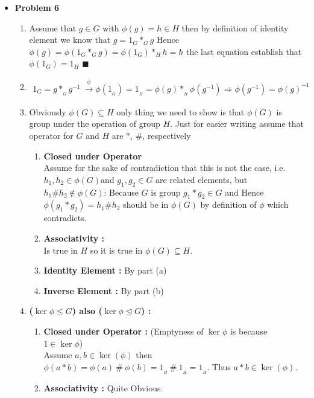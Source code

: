 \documentclass{article}
\begin{document}
\begin{itemize}
	\item{\textcolor{for}{\textbf{Problem 6}}}
		\begin{enumerate}[label=(\alph*)]
			\item Assume that $g\in G$ with $\phi(g)=h\in H$ then by definition of identity element we know that $g = 1_{G} *_{G} g$
				Hence $\phi(g) = \phi(1_{G} *_{G} g) = \phi(1_{G}) *_{H} h = h$ the last equation establish that 
				$\phi(1_{G}) = 1_{H}$ $\blacksquare$
			\item 
				\begin{align*}
					1_G = g *_{{}_{G}} g^{-1}\ \xrightarrow{\phi} \phi(1_{{}_{G}}) = 1_{{}_{H}} = \phi(g) *_{{}_{H}} \phi(g^{-1})
					\Rightarrow \phi(g^{-1}) = \left.\phi(g)\right.^{-1}\
				\end{align*}
			\item Obviously $\phi(G)\subseteq H$ only thing we need to show is that $\phi(G)$ is group under the operation of group $H$.
				Just for easier writing assume that operator for $G$ and $H$ are $*$, $\#$, respectively
				\begin{enumerate}[label=(\textbf{\Roman*})]
					\item{\textbf{Closed under Operator}} \\
						Assume for the sake of contradiction that this is not the case, i.e. 
						$h_1, h_2\in \phi(G)$and $g_1, g_2 \in G$ are related elements, but $h_1 \# h_2 \not\in \phi(G)$:
						Because $G$ is group $g_1*g_2\in G$ and Hence $\phi(g_1 * g_2) = h_1 \# h_2$ should be in
						$\phi(G)$ by definition of $\phi$ which contradicts.
					\item {\textbf{Associativity :}} \\
						Is true in $H$ so it is true in $\phi(G)\subseteq H$.
					\item {\textbf{Identity Element :}} By part (a)
					\item {\textbf{Inverse Element :}} By part (b) 
				\end{enumerate}
			\item{\textbf{($\ker{\phi}\leq G$) also ($\ker{\phi}\unlhd G$) :}}
				\begin{enumerate}[label=(\textbf{\Roman*})]
					\item{\textbf{Closed under Operator :}} (Emptyness of $\ker{\phi}$ is because $1\in\ker{\phi}$) \\
						Assume $a,b \in \ker(\phi)$ then $\phi(a*b)= \phi(a)\ \#\ \phi(b) = 1_{{}_{H}}\ \#\ 1_{{}_{H}} = 1_{{}_{H}}$.
						Thus $a*b\in \ker(\phi)$.
					\item {\textbf{Associativity :}} Quite Obvious.

\end{enumerate}
\end{enumerate}
\end{itemize}
\end{document}

